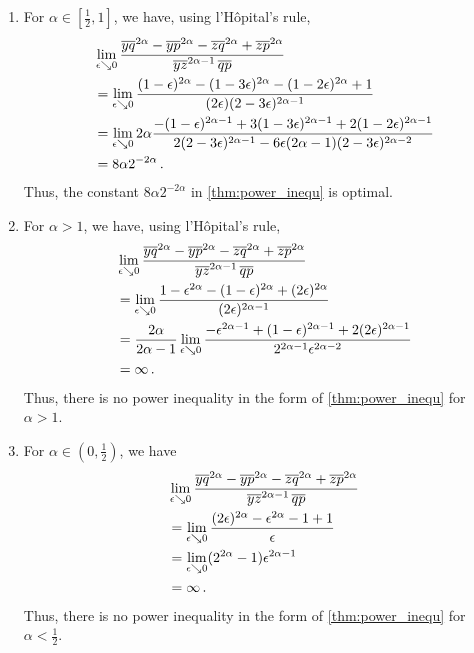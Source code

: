 \begin{enumerate}[label=(\alph*)]
\item 
	For $\alpha \in [\frac12,1]$, we have, using l'Hôpital's rule,
	\begin{align*}
	&\lim_{\epsilon\searrow0}\frac{\overline{yq}^{2\alpha} - \overline{yp}^{2\alpha} - \overline{zq}^{2\alpha} + \overline{zp}^{2\alpha}}{ \overline{yz}^{2\alpha-1}\, \overline{qp}} 
	\\&= 
	\lim_{\epsilon\searrow0}\frac{(1-\epsilon)^{2\alpha} - (1-3\epsilon)^{2\alpha} - (1-2\epsilon)^{2\alpha} + 1}{ (2\epsilon)(2-3\epsilon)^{2\alpha-1}}
	\\&=
	\lim_{\epsilon\searrow0} 2\alpha\frac{-(1-\epsilon)^{2\alpha-1} + 3(1-3\epsilon)^{2\alpha-1} + 2(1-2\epsilon)^{2\alpha-1}}{ 2(2-3\epsilon)^{2\alpha-1}-6\epsilon(2\alpha-1)(2-3\epsilon)^{2\alpha-2}}
	\\&=8\alpha2^{-2\alpha}
	\, .
	\end{align*}
	Thus, the constant $8\alpha2^{-2\alpha}$ in \autoref{thm:power_inequ} is optimal.
\item	
	For $\alpha >1$, we have, using l'Hôpital's rule,
	\begin{align*}
	&\lim_{\epsilon\searrow0}\frac{\overline{yq}^{2\alpha} - \overline{yp}^{2\alpha} - \overline{zq}^{2\alpha} + \overline{zp}^{2\alpha}}{ \overline{yz}^{2\alpha-1}\, \overline{qp}} 
	\\&= 
	\lim_{\epsilon\searrow0} \frac{1 -\epsilon^{2\alpha} - (1-\epsilon)^{2\alpha} + (2\epsilon)^{2\alpha}}{ (2\epsilon)^{2\alpha-1}} 
	\\&=
	\frac{2\alpha}{2\alpha-1} \lim_{\epsilon\searrow0} \frac{ - \epsilon^{2\alpha-1} + (1-\epsilon)^{2\alpha-1} + 2	(2\epsilon)^{2\alpha-1}}{ 2^{2\alpha-1}\epsilon^{2\alpha-2}}
	\\&=
	\infty
	\, .
	\end{align*}
	Thus, there is no power inequality in the form of \autoref{thm:power_inequ} for $\alpha > 1$.
\item
	For $\alpha \in (0,\frac12)$, we have
	\begin{align*}
	&\lim_{\epsilon\searrow0}\frac{\overline{yq}^{2\alpha} - \overline{yp}^{2\alpha} - \overline{zq}^{2\alpha} + \overline{zp}^{2\alpha}}{ \overline{yz}^{2 \alpha-1}\, \overline{qp}} 
	\\&= 
	\lim_{\epsilon\searrow0}\frac{(2\epsilon)^{2\alpha} - \epsilon^{2\alpha} - 1 + 1}{\epsilon} 
	\\&=
	\lim_{\epsilon\searrow0} (2^{2\alpha}-1)\epsilon^{2\alpha-1}
	\\&=\infty
	\, .
	\end{align*}
	Thus, there is no power inequality in the form of \autoref{thm:power_inequ} for $\alpha < \frac12$.
\end{enumerate}
%
%
%
